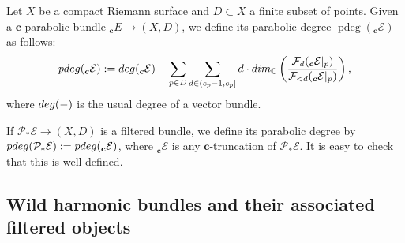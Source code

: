 \documentclass[11pt]{article}
\numberwithin{equation}{section}
\numberwithin{equation}{section}
\begin{document}
\begin{Definition} Let $X$ be a compact Riemann surface and $D\subset X$ a finite subset of points. Given a $\boldsymbol{c}$-parabolic bundle $_{\boldsymbol{c}}E\to (X,D)$, we define its parabolic degree $\operatorname{pdeg}(_{\boldsymbol{c}}\mathcal{E})$ as follows:
\begin{equation*}
 \textnormal{pdeg}(_{\boldsymbol{c}}\mathcal{E}):= \textnormal{deg}(_{\boldsymbol{c}}\mathcal{E}) - \sum_{p\in D}\sum_{d\in (c_p-1,c_p]} d\cdot \textnormal{dim}_{\mathbb{C}}\left(\frac{\mathcal{F}_d(_{\boldsymbol{c}}\mathcal{E}|_p)}{{\mathcal{F}_{<d}(_{\boldsymbol{c}}\mathcal{E}|_p)}}\right),
\end{equation*}
where $\textnormal{deg}(-)$ is the usual degree of a vector bundle.

If $\mathcal{P}_*\mathcal{E} \to (X,D)$ is a filtered bundle, we define its parabolic degree by
$
 \textnormal{pdeg}(\mathcal{P}_*\mathcal{E}):=\textnormal{pdeg}(_{\boldsymbol{c}}\mathcal{E})$,
where $_{\boldsymbol{c}}\mathcal{E}$ is any $\boldsymbol{c}$-truncation of $\mathcal{P}_*\mathcal{E}$. It is easy to check that this is well defined.

\end{Definition}

\subsection{Wild harmonic bundles and their associated filtered objects}\label{WHB}
\end{document}
